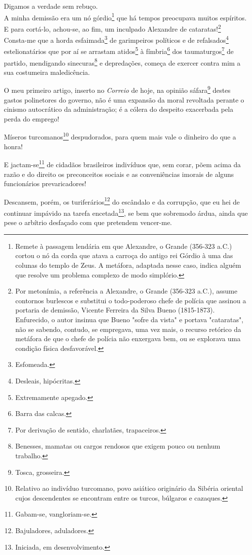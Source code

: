 Digamos a verdade sem rebuço.\\
A minha demissão era um nó górdio\footnote{Remete à passagem lendária
  em que Alexandre, o Grande (356-323 a.C.) cortou o nó da corda que
  atava a carroça do antigo rei Górdio à uma das colunas do templo de
  Zeus. A metáfora, adaptada nesse caso, indica alguém que resolve um
  problema complexo de modo simplório.} que há tempos preocupava muitos
espíritos. E para cortá-lo, achou-se, ao fim, um inculpado Alexandre de
cataratas!\footnote{Por metonímia, a referência a Alexandre, o Grande
  (356-323 a.C.), assume contornos burlescos e substitui o todo-poderoso
  chefe de polícia que assinou a portaria de demissão, Vicente Ferreira
  da Silva Bueno (1815-1873). Enfurecido, o autor insinua que Bueno
  "sofre da vista" e portava "cataratas", não se sabendo, contudo, se
  empregava, uma vez mais, o recurso retórico da metáfora de que o chefe
  de polícia não enxergava bem, ou se explorava uma condição física
  desfavorável.}\\
Consta-me que a horda esfaimada\footnote{Esfomeada.} de garimpeiros
políticos e de refalsados\footnote{Desleais, hipócritas.}
estelionatários que por aí se arrastam atidos\footnote{Extremamente
  apegado.} à fímbria\footnote{Barra das calcas.} dos
taumaturgos\footnote{Por derivação de sentido, charlatães,
  trapaceiros.} de partido, mendigando sinecuras\footnote{Benesses,
  mamatas ou cargos rendosos que exigem pouco ou nenhum trabalho.} e
depredações, começa de exercer contra mim a sua costumeira maledicência.

O meu primeiro artigo, inserto no \emph{Correio} de hoje, na opinião
sáfara\footnote{Tosca, grosseira.} destes gastos polinetores do
governo, não é uma expansão da moral revoltada perante o cinismo
autocrático da administração; é a cólera do despeito exacerbada pela
perda do emprego!

Míseros turcomanos\footnote{Relativo ao indivíduo turcomano, povo
  asiático originário da Sibéria oriental cujos descendentes se
  encontram entre os turcos, búlgaros e cazaques.} despudorados, para
quem mais vale o dinheiro do que a honra!

E jactam-se\footnote{Gabam-se, vangloriam-se.} de cidadãos brasileiros
indivíduos que, sem corar, põem acima da razão e do direito os
preconceitos sociais e as conveniências imorais de alguns funcionários
prevaricadores!

Descansem, porém, os turiferários\footnote{Bajuladores, aduladores.}
do escândalo e da corrupção, que eu hei de continuar impávido na tarefa
encetada\footnote{Iniciada, em desenvolvimento.}, se bem que sobremodo
árdua, ainda que pese o arbítrio desfaçado com que pretendem vencer-me.

